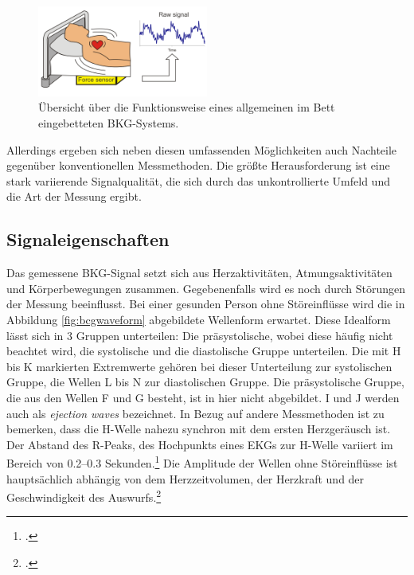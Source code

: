 	 \begin{figure}[H]
	 	\centering
		\includegraphics[width=0.5\textwidth]{pic/bcgBed.png}
		\caption[Übersicht über die Funktionsweise eines allgemeinen im Bett eingebetteten \ac{BKG}-Systems]{Übersicht über die Funktionsweise eines allgemeinen im Bett eingebetteten \ac{BKG}-Systems.\protect\footnotemark}
		\label{fig:bcgbed}
	\end{figure}
	
	Allerdings ergeben sich neben diesen umfassenden Möglichkeiten auch Nachteile gegenüber konventionellen Messmethoden. Die größte Herausforderung ist eine stark variierende Signalqualität, die sich durch das unkontrollierte Umfeld und die Art der Messung ergibt.

	\subsection{Signaleigenschaften}
	
	Das gemessene \ac{BKG}-Signal setzt sich aus Herzaktivitäten, Atmungsaktivitäten und Körperbewegungen zusammen. Gegebenenfalls wird es noch durch Störungen der Messung beeinflusst. Bei einer gesunden Person ohne Störeinflüsse wird die in Abbildung \ref{fig:bcgwaveform} abgebildete Wellenform erwartet. Diese Idealform lässt sich in 3 Gruppen unterteilen: Die präsystolische, wobei diese häufig nicht beachtet wird, die systolische und die diastolische Gruppe unterteilen. Die mit H bis K markierten Extremwerte gehören bei dieser Unterteilung zur systolischen Gruppe, die Wellen L bis N zur diastolischen Gruppe. Die präsystolische Gruppe, die aus den Wellen F und G besteht, ist in hier nicht abgebildet. I und J werden auch als \textit{ejection waves} bezeichnet. In Bezug auf andere Messmethoden ist zu bemerken, dass die H-Welle nahezu synchron mit dem ersten Herzgeräusch ist. Der Abstand des R-Peaks, des Hochpunkts eines \ac{EKG}s zur H-Welle variiert im Bereich von \numrange{0,2}{0,3} Sekunden.\footcite[Vgl.][]{DELALLA1950} Die Amplitude der Wellen ohne Störeinflüsse ist hauptsächlich abhängig von dem Herzzeitvolumen, der Herzkraft und der Geschwindigkeit des Auswurfs.\footcite[Vgl.][]{Pinheiro2010}
	

